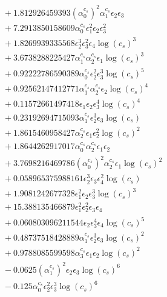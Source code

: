 \documentclass[10pt]{article}
\begin{document}
\begin{align*}
&{}  + 1.812926459393 \left(\alpha_{0}^{c_s}\right)^{2} \alpha_{1}^{c_s} \epsilon_{2} \epsilon_{3} \\
&{}  + 7.2913850158609 \alpha_{0}^{c_s} \epsilon_{1}^{2} \epsilon_{2} \epsilon_{3}^{2} \\
&{}  + 1.8269939335568 \epsilon_{2}^{3} \epsilon_{3}^{2} \epsilon_{4} \log{\left(c_{s} \right)}^{3} \\
&{}  + 3.6738288225427 \alpha_{1}^{c_s} \alpha_{2}^{c_s} \epsilon_{1} \log{\left(c_{s} \right)}^{3} \\
&{}  + 0.92222786590389 \alpha_{0}^{c_s} \epsilon_{2}^{2} \epsilon_{3}^{3} \log{\left(c_{s} \right)}^{5} \\
&{}  + 0.92562147412771 \alpha_{1}^{c_s} \alpha_{2}^{c_s} \epsilon_{2} \log{\left(c_{s} \right)}^{4} \\
&{}  + 0.11572661497418 \epsilon_{1} \epsilon_{2} \epsilon_{3}^{4} \log{\left(c_{s} \right)}^{4} \\
&{}  + 0.23192694715093 \alpha_{1}^{c_s} \epsilon_{2}^{3} \epsilon_{3} \log{\left(c_{s} \right)} \\
&{}  + 1.8615460958427 \alpha_{2}^{c_s} \epsilon_{1} \epsilon_{2}^{2} \log{\left(c_{s} \right)}^{2} \\
&{}  + 1.8644262917017 \alpha_{0}^{c_s} \alpha_{2}^{c_s} \epsilon_{1} \epsilon_{2} \\
&{}  + 3.7698216469786 \left(\alpha_{0}^{c_s}\right)^{2} \alpha_{2}^{c_s} \epsilon_{1} \log{\left(c_{s} \right)}^{2} \\
&{}  + 0.058965375988161 \epsilon_{2}^{3} \epsilon_{3} \epsilon_{4}^{2} \log{\left(c_{s} \right)} \\
&{}  + 1.9081242677328 \epsilon_{1}^{2} \epsilon_{2} \epsilon_{3}^{3} \log{\left(c_{s} \right)}^{3} \\
&{}  + 15.388135466879 \epsilon_{1}^{2} \epsilon_{2}^{2} \epsilon_{3} \epsilon_{4} \\
&{}  + 0.060803096211544 \epsilon_{2} \epsilon_{3}^{4} \epsilon_{4} \log{\left(c_{s} \right)}^{5} \\
&{}  + 0.48737518428889 \alpha_{1}^{c_s} \epsilon_{2}^{3} \epsilon_{3} \log{\left(c_{s} \right)}^{2} \\
&{}  + 0.9788085599598 \alpha_{3}^{c_s} \epsilon_{1} \epsilon_{2} \log{\left(c_{s} \right)}^{2} \\
&{}  - 0.0625 \left(\alpha_{1}^{c_s}\right)^{2} \epsilon_{2} \epsilon_{3} \log{\left(c_{s} \right)}^{6} \\
&{}  - 0.125 \alpha_{0}^{c_s} \epsilon_{2}^{2} \epsilon_{3}^{3} \log{\left(c_{s} \right)}^{6} \\

\end{align*}
\end{document}
